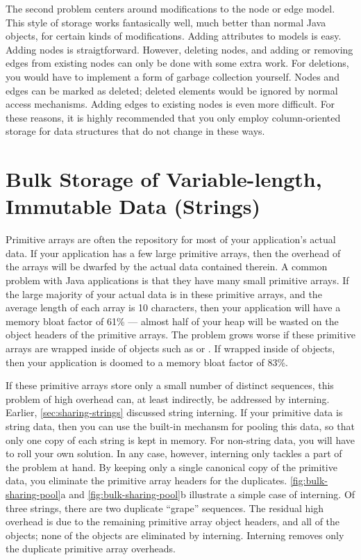 The second problem centers around modifications to the node or edge model. This
style of storage works fantasically well, much better than normal Java objects,
for certain kinds of modifications. Adding attributes to models is easy.
Adding nodes is straigtforward. However, deleting nodes, and adding or
removing edges from existing nodes can only be done with some extra work. For
deletions, you would have to implement a form of garbage collection yourself.
Nodes and edges can be marked as deleted; deleted elements would be ignored by
normal access mechanisms. Adding edges to existing nodes is even more difficult.
For these reasons, it is highly recommended that you only employ column-oriented
storage for data structures that do not change in these ways.

\section{Bulk Storage of Variable-length, Immutable Data (Strings)}
\label{sec:bulk-sharing-pool}

Primitive arrays are often the repository for most of your application's actual
data. If your application has a few large primitive arrays, then the overhead of
the arrays will be dwarfed by the actual data contained therein. A common problem
with Java applications is that they have many small primitive arrays.
 If the large majority of your actual data is in
these primitive arrays, and the average length of each array is 10 characters,
then your application will have a memory bloat factor of 61\%
--- almost half of your heap will be wasted on the object headers of the
primitive arrays. The problem grows worse if these primitive arrays are wrapped
inside of objects such as  or . If
wrapped inside of  objects, then your application is doomed to a
memory bloat factor of 83\%.

If these primitive arrays store only a small number of distinct sequences, this
problem of high overhead can, at least indirectly, be addressed by
interning. Earlier, \autoref{sec:sharing-strings} discussed
string interning. If your primitive data is string data, then you can use the
\jres built-in mechansm for pooling this data, so that only one copy of each
string is kept in memory. For non-string data, you will have to roll your own
solution. In any case, however, interning only tackles a part of the problem at
hand. By keeping only a single canonical copy of the primitive data, you
eliminate the primitive array headers for the duplicates.
\autoref{fig:bulk-sharing-pool}a and \autoref{fig:bulk-sharing-pool}b illustrate
a simple case of interning. Of three strings, there are two duplicate ``grape''
sequences. The residual high overhead is due to the remaining primitive array
object headers, and all of the  objects; none of the 
objects are eliminated by interning. Interning removes only the duplicate
primitive array overheads.


